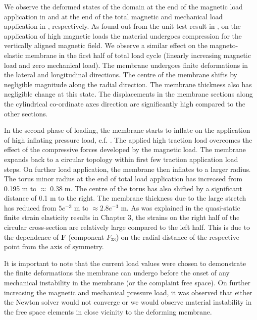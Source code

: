 We observe the deformed states of the domain at the end of the magnetic load application  in  and at the end of the total magnetic and mechanical load application in , respectively. As found out from the unit test result in , on the application of high magnetic loads the material undergoes compression for the vertically aligned magnetic field. We observe a similar effect on the magneto-elastic membrane in the first half of total load cycle (linearly increasing magnetic load and zero mechanical load). The membrane undergoes finite deformations in the lateral and longitudinal directions. The centre of the membrane shifts by negligible magnitude along the radial direction. The membrane thickness also has negligible change at this state. The displacements in the membrane sections along the cylindrical co-ordinate axes direction are significantly high compared to the other sections. \par 
In the second phase of loading, the membrane starts to inflate on the application of high inflating pressure load, c.f. . The applied high traction load overcomes the effect of the compressive forces developed by the magnetic load. The membrane expands back to a circular topology within first few traction application load steps. On further load application, the membrane then inflates to a larger radius. The torus minor radius at the end of total load application has increased from 0.195 m to $\approx$ 0.38 m. The centre of the torus has also shifted by a significant distance of 0.1 m to the right. The membrane thickness due to the large stretch has reduced from $5e^{-3}$ m to $\approx 2.8e^{-3}$ m. As was explained in the quasi-static finite strain elasticity results in Chapter 3, the strains on the right half of the circular cross-section are relatively large compared to the left half. This is due to the dependence of $\mathbf{F}$ (component $F_{33}$) on the radial distance of the respective point from the axis of symmetry. \par 

It is important to note that the current load values were chosen to demonstrate the finite deformations the membrane can undergo before the onset of any mechanical instability in the membrane (or the complaint free space). On further increasing the magnetic and mechanical pressure load, it was observed that either the Newton solver would not converge or we would observe material instability in the free space elements in close vicinity to the deforming membrane. \par 

